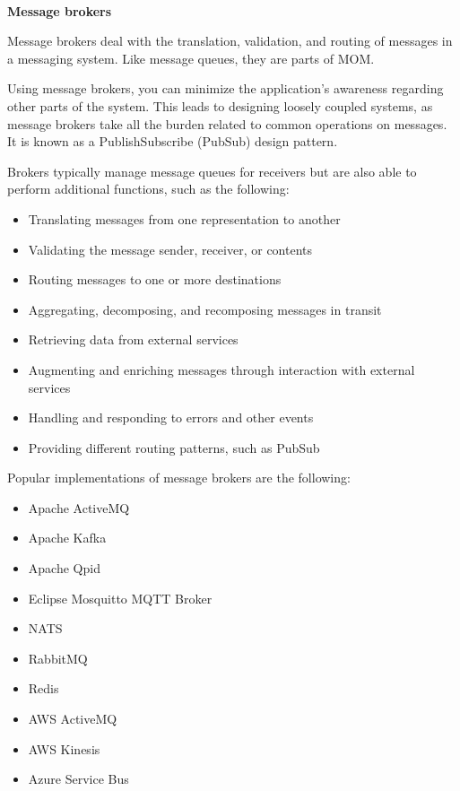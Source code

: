\hspace*{\fill} \\ %
\noindent
\textbf{Message brokers}

Message brokers deal with the translation, validation, and routing of messages in a messaging system. Like message queues, they are parts of MOM.

Using message brokers, you can minimize the application's awareness regarding other parts of the system. This leads to designing loosely coupled systems, as message brokers take all the burden related to common operations on messages. It is known as a PublishSubscribe (PubSub) design pattern.

Brokers typically manage message queues for receivers but are also able to perform additional functions, such as the following:

\begin{itemize}
\item 
Translating messages from one representation to another

\item 
Validating the message sender, receiver, or contents

\item 
Routing messages to one or more destinations

\item 
Aggregating, decomposing, and recomposing messages in transit

\item 
Retrieving data from external services

\item 
Augmenting and enriching messages through interaction with external services

\item 
Handling and responding to errors and other events

\item 
Providing different routing patterns, such as PubSub
\end{itemize}

Popular implementations of message brokers are the following:

\begin{itemize}
\item 
Apache ActiveMQ

\item 
Apache Kafka

\item 
Apache Qpid

\item 
Eclipse Mosquitto MQTT Broker

\item 
NATS

\item 
RabbitMQ

\item 
Redis

\item 
AWS ActiveMQ

\item 
AWS Kinesis

\item 
Azure Service Bus
\end{itemize}

